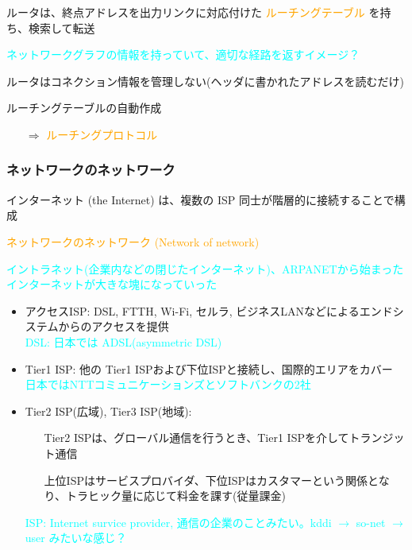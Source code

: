 ルータは、終点アドレスを出力リンクに対応付けた \textcolor{orange}{ルーチングテーブル} を持ち、検索して転送

\indent\indent\textcolor{cyan}{ネットワークグラフの情報を持っていて、適切な経路を返すイメージ？}

ルータはコネクション情報を管理しない(ヘッダに書かれたアドレスを読むだけ)

ルーチングテーブルの自動作成
\begin{itemize}
  \item[$\Rightarrow$] \textcolor{orange}{ルーチングプロトコル}
\end{itemize}

\newpage
\subsubsection{ネットワークのネットワーク}
インターネット (the Internet) は、複数の ISP 同士が階層的に接続することで構成

\indent\textcolor{orange}{ネットワークのネットワーク (Network of network)}

\textcolor{cyan}{イントラネット(企業内などの閉じたインターネット)、ARPANETから始まったインターネットが大きな塊になっていった}

\begin{itemize}
  \item アクセスISP: DSL, FTTH, Wi-Fi, セルラ, ビジネスLANなどによるエンドシステムからのアクセスを提供\\
    \textcolor{cyan}{DSL: 日本では ADSL(asymmetric DSL)}
  \item Tier1 ISP: 他の Tier1 ISPおよび下位ISPと接続し、国際的エリアをカバー\\
    \textcolor{cyan}{日本ではNTTコミュニケーションズとソフトバンクの2社}
  \item Tier2 ISP(広域), Tier3 ISP(地域):
  \begin{itemize}
    \item[] Tier2 ISPは、グローバル通信を行うとき、Tier1 ISPを介してトランジット通信
    \item[] 上位ISPはサービスプロバイダ、下位ISPはカスタマーという関係となり、トラヒック量に応じて料金を課す(従量課金)
  \end{itemize}
  \textcolor{cyan}{ISP: Internet survice provider, 通信の企業のことみたい。kddi $\rightarrow$ so-net $\rightarrow$ user みたいな感じ？}
\end{itemize}

